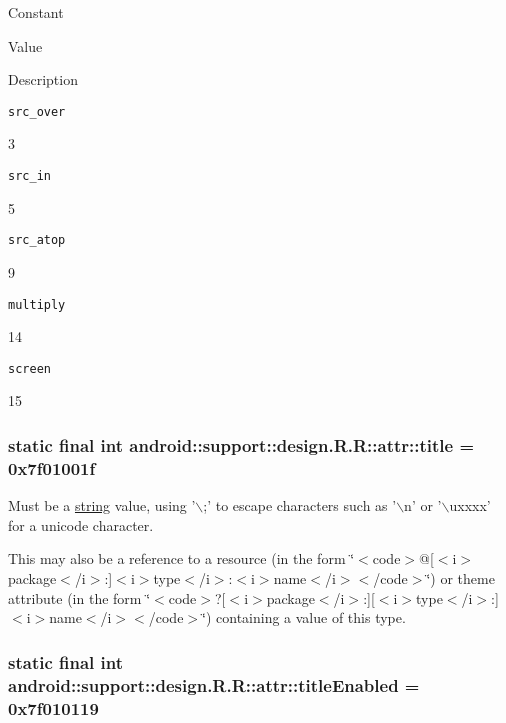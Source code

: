Constant

Value

Description 

{\tt src\_\-over}

3

{\tt src\_\-in}

5

{\tt src\_\-atop}

9

{\tt multiply}

14

{\tt screen}

15\hypertarget{classandroid_1_1support_1_1design_1_1_r_1_1attr_ae9d0a0bfd87e52b46cdfc22a1bc6596}{
\subsubsection[{title}]{\setlength{\rightskip}{0pt plus 5cm}static final int android::support::design.R.R::attr::title = 0x7f01001f}}
\label{classandroid_1_1support_1_1design_1_1_r_1_1attr_ae9d0a0bfd87e52b46cdfc22a1bc6596}


Must be a \hyperlink{classandroid_1_1support_1_1design_1_1_r_1_1string}{string} value, using '$\backslash$;' to escape characters such as '$\backslash$n' or '$\backslash$uxxxx' for a unicode character. 

This may also be a reference to a resource (in the form \char`\"{}$<$code$>$@\mbox{[}$<$i$>$package$<$/i$>$:\mbox{]}$<$i$>$type$<$/i$>$:$<$i$>$name$<$/i$>$$<$/code$>$\char`\"{}) or theme attribute (in the form \char`\"{}$<$code$>$?\mbox{[}$<$i$>$package$<$/i$>$:\mbox{]}\mbox{[}$<$i$>$type$<$/i$>$:\mbox{]}$<$i$>$name$<$/i$>$$<$/code$>$\char`\"{}) containing a value of this type. \hypertarget{classandroid_1_1support_1_1design_1_1_r_1_1attr_62420dad3eec4504499c07504d07e5e7}{
\subsubsection[{titleEnabled}]{\setlength{\rightskip}{0pt plus 5cm}static final int android::support::design.R.R::attr::titleEnabled = 0x7f010119}}
\label{classandroid_1_1support_1_1design_1_1_r_1_1attr_62420dad3eec4504499c07504d07e5e7}


